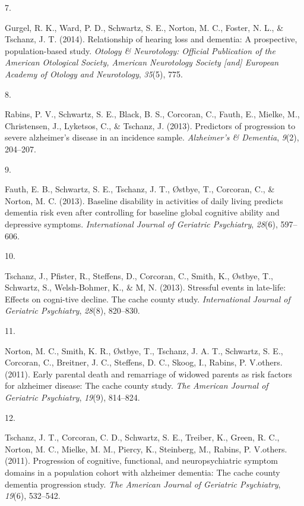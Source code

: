 \documentclass[11pt,a4paper,]{moderncv}
\newlength{\csllabelwidth}
\newcommand{\CSLLeftMargin}[1]{\parbox[t]{\csllabelwidth}{#1}}
\newcommand{\CSLRightInline}[1]{\parbox[t]{\linewidth - \csllabelwidth}{#1}}
\begin{document}
\leavevmode{}%
\CSLLeftMargin{7. }
\CSLRightInline{Gurgel, R. K., Ward, P. D., Schwartz, S. E., Norton, M.
C., Foster, N. L., \& Tschanz, J. T. (2014). Relationship of hearing
loss and dementia: A prospective, population-based study. \emph{Otology
\& Neurotology: Official Publication of the American Otological Society,
American Neurotology Society {[}and{]} European Academy of Otology and
Neurotology}, \emph{35}(5), 775.}

\leavevmode{}%
\CSLLeftMargin{8. }
\CSLRightInline{Rabins, P. V., Schwartz, S. E., Black, B. S., Corcoran,
C., Fauth, E., Mielke, M., Christensen, J., Lyketsos, C., \& Tschanz, J.
(2013). Predictors of progression to severe alzheimer's disease in an
incidence sample. \emph{Alzheimer's \& Dementia}, \emph{9}(2),
204--207.}

\leavevmode{}%
\CSLLeftMargin{9. }
\CSLRightInline{Fauth, E. B., Schwartz, S. E., Tschanz, J. T., Østbye,
T., Corcoran, C., \& Norton, M. C. (2013). Baseline disability in
activities of daily living predicts dementia risk even after controlling
for baseline global cognitive ability and depressive symptoms.
\emph{International Journal of Geriatric Psychiatry}, \emph{28}(6),
597--606.}

\leavevmode{}%
\CSLLeftMargin{10. }
\CSLRightInline{Tschanz, J., Pfister, R., Steffens, D., Corcoran, C.,
Smith, K., Østbye, T., Schwartz, S., Welsh-Bohmer, K., \& M, N. (2013).
Stressful events in late-life: Effects on cogni-tive decline. The cache
county study. \emph{International Journal of Geriatric Psychiatry},
\emph{28}(8), 820--830.}

\leavevmode{}%
\CSLLeftMargin{11. }
\CSLRightInline{Norton, M. C., Smith, K. R., Østbye, T., Tschanz, J. A.
T., Schwartz, S. E., Corcoran, C., Breitner, J. C., Steffens, D. C.,
Skoog, I., Rabins, P. V.others. (2011). Early parental death and
remarriage of widowed parents as risk factors for alzheimer disease: The
cache county study. \emph{The American Journal of Geriatric Psychiatry},
\emph{19}(9), 814--824.}

\leavevmode{}%
\CSLLeftMargin{12. }
\CSLRightInline{Tschanz, J. T., Corcoran, C. D., Schwartz, S. E.,
Treiber, K., Green, R. C., Norton, M. C., Mielke, M. M., Piercy, K.,
Steinberg, M., Rabins, P. V.others. (2011). Progression of cognitive,
functional, and neuropsychiatric symptom domains in a population cohort
with alzheimer dementia: The cache county dementia progression study.
\emph{The American Journal of Geriatric Psychiatry}, \emph{19}(6),
532--542.}
\end{document}
